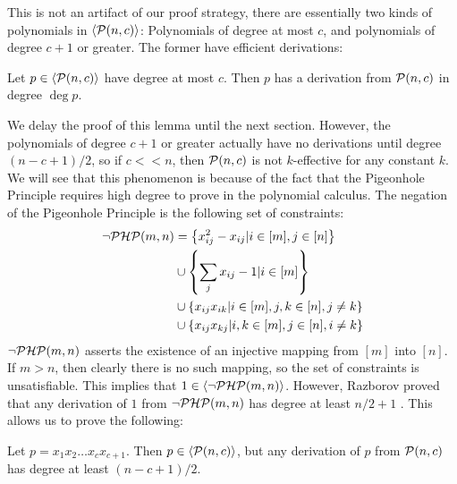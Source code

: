This is not an artifact of our proof strategy, there are essentially two kinds of polynomials in $\langle \mathcal P(n,c) \rangle$:
Polynomials of degree at most $c$, and polynomials of degree $c+1$ or greater. 
The former have efficient derivations:
\begin{lemma}\label{lem:bcsp-lowdeg}
Let $p \in \langle \mathcal P(n,c) \rangle$ have degree at most $c$. Then $p$ has a derivation from $\mathcal P(n,c)$ in degree $\deg p$.
\end{lemma}
We delay the proof of this lemma until the next section. 
However, the polynomials of degree $c+1$ or greater actually have no derivations until degree $(n-c+1)/2$, so if $c << n$, then $\mathcal P(n,c)$ is not $k$-effective for any constant $k$.
We will see that this phenomenon is because of the fact that the Pigeonhole Principle requires high degree to prove in the polynomial calculus. 
The negation of the Pigeonhole Principle is the following set of constraints:
\begin{align*}
\neg\mathcal P\mathcal H\mathcal P(m,n) &= \left\{x_{ij}^2 - x_{ij} | i \in [m], j \in [n]\right\} \\
&\cup \left\{\sum_j x_{ij} - 1 | i \in [m]\right\} \\
&\cup \left\{x_{ij}x_{ik} | i \in [m], j,k \in [n], j \neq k\right\} \\
&\cup \left\{x_{ij}x_{kj} | i,k \in [m], j \in [n], i \neq k\right\}
\end{align*}
$\neg\mathcal P\mathcal H\mathcal P(m,n)$ asserts the existence of an injective mapping from $[m]$ into $[n]$. If $m > n$, then clearly there is no such mapping, so the set of constraints is unsatisfiable. This implies that $1 \in \langle \neg\mathcal P\mathcal H\mathcal P(m,n) \rangle$. However, Razborov proved that any derivation of $1$ from $\neg\mathcal P\mathcal H\mathcal P(m,n)$ has degree at least $n/2 + 1$ \cite{}.
This allows us to prove the following:
\begin{lemma}\label{lem:bcsp-highdeg-hard}
Let $p = x_1x_2\dots x_c x_{c+1}$. Then $p \in \langle \mathcal P(n,c) \rangle$, but any derivation of $p$ from $\mathcal P(n,c)$ has degree at least $(n-c+1)/2$. 
\end{lemma}
